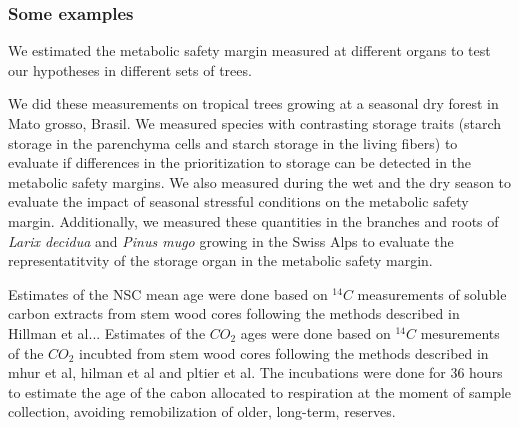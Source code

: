 \documentclass{article}
\begin{document}
%

\subsubsection{Some examples}

We estimated the metabolic safety margin measured at different organs to test our hypotheses in different sets of trees.

We did these measurements on tropical trees growing at a seasonal dry forest in Mato grosso, Brasil. 
We measured species with contrasting storage traits (starch storage in the parenchyma cells and starch storage in the living fibers) to evaluate if differences in the prioritization to storage can be detected in the metabolic safety margins.
We also measured during the wet and the dry season to evaluate the impact of seasonal stressful conditions on the metabolic safety margin. 
Additionally, we measured these quantities in the branches and roots of \textit{Larix decidua} and \textit{Pinus mugo} growing in the Swiss Alps to evaluate the representatitvity of the storage organ in the metabolic safety margin. 
 
Estimates of the NSC mean age were done based on  $^{14}C$ measurements of soluble carbon extracts from stem wood cores following the methods described in Hillman et al...
Estimates of the $CO_{2}$ ages were done based on  $^{14}C$ mesurements of the $CO_{2}$ incubted from stem wood cores following the methods described in mhur et al, hilman et al and pltier et al. 
The incubations were done for 36 hours to estimate the age of the cabon allocated to respiration at the moment of sample collection, avoiding remobilization of older, long-term, reserves. 
\end{document}
